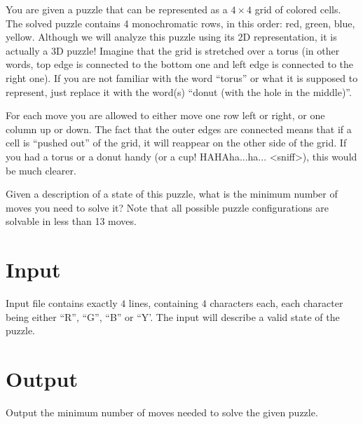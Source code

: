 
You are given a puzzle that can be represented as a $4 \times 4$ grid of 
colored cells. The solved puzzle contains 4 monochromatic rows, in this 
order: red, green, blue, yellow. Although we will analyze this puzzle 
using its 2D representation, it is actually a 3D puzzle! Imagine that 
the grid is stretched over a torus (in other words, top edge is 
connected to the bottom one and left edge is connected to the right 
one). If you are not familiar with the word ``torus'' or what it is 
supposed to represent, just replace it with the word(s) ``donut (with 
the hole in the middle)''.


For each move you are allowed to either move one row left or right, or 
one column up or down. The fact that the outer edges are connected means 
that if a cell is ``pushed out'' of the grid, it will reappear on the 
other side of the grid. If you had a torus or a donut handy (or a cup! 
HAHAha...ha... <sniff>), this would be much clearer.

Given a description of a state of this puzzle, what is the minimum 
number of moves you need to solve it? Note that all possible puzzle 
configurations are solvable in less than 13 moves.

\section*{Input}

Input file contains exactly $4$ lines, containing $4$ characters each, each 
character being either ``R'', ``G'', ``B'' or ``Y'. The input will describe a 
valid state of the puzzle.

\section*{Output}

Output the minimum number of moves needed to solve the given puzzle.
